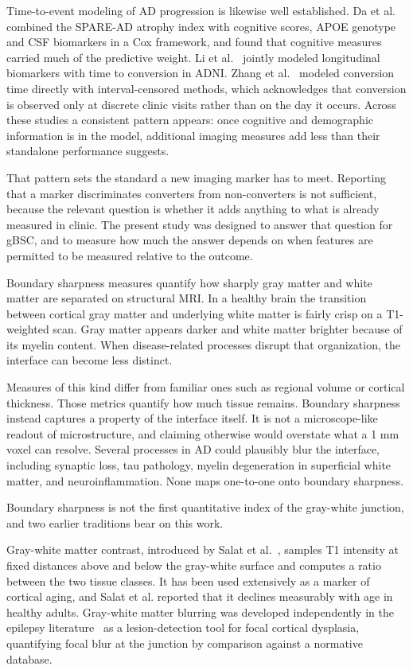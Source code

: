 \documentclass[blue]{ludusofficial}  %
\begin{document}
Time-to-event modeling of AD progression is likewise well established. Da et al.~\cite{da2014integration} combined the SPARE-AD atrophy index with cognitive scores, APOE genotype and CSF biomarkers in a Cox framework, and found that cognitive measures carried much of the predictive weight. Li et al.~\cite{li2017prediction} jointly modeled longitudinal biomarkers with time to conversion in ADNI. Zhang et al.~\cite{zhang2024interval} modeled conversion time directly with interval-censored methods, which acknowledges that conversion is observed only at discrete clinic visits rather than on the day it occurs. Across these studies a consistent pattern appears: once cognitive and demographic information is in the model, additional imaging measures add less than their standalone performance suggests.

That pattern sets the standard a new imaging marker has to meet. Reporting that a marker discriminates converters from non-converters is not sufficient, because the relevant question is whether it adds anything to what is already measured in clinic. The present study was designed to answer that question for gBSC, and to measure how much the answer depends on when features are permitted to be measured relative to the outcome.

Boundary sharpness measures quantify how sharply gray matter and white matter are separated on structural MRI. In a healthy brain the transition between cortical gray matter and underlying white matter is fairly crisp on a T1-weighted scan. Gray matter appears darker and white matter brighter because of its myelin content. When disease-related processes disrupt that organization, the interface can become less distinct.

Measures of this kind differ from familiar ones such as regional volume or cortical thickness. Those metrics quantify how much tissue remains. Boundary sharpness instead captures a property of the interface itself. It is not a microscope-like readout of microstructure, and claiming otherwise would overstate what a 1 mm voxel can resolve. Several processes in AD could plausibly blur the interface, including synaptic loss, tau pathology, myelin degeneration in superficial white matter, and neuroinflammation. None maps one-to-one onto boundary sharpness.


Boundary sharpness is not the first quantitative index of the gray-white junction, and two earlier traditions bear on this work.

Gray-white matter contrast, introduced by Salat et al.~\cite{salat2009age}, samples T1 intensity at fixed distances above and below the gray-white surface and computes a ratio between the two tissue classes. It has been used extensively as a marker of cortical aging, and Salat et al. reported that it declines measurably with age in healthy adults. Gray-white matter blurring was developed independently in the epilepsy literature~\cite{huppertz2005enhanced,blackmon2015cortical} as a lesion-detection tool for focal cortical dysplasia, quantifying focal blur at the junction by comparison against a normative database.
\end{document}
